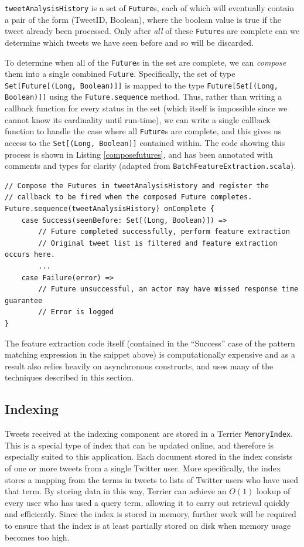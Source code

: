 \documentclass{l4proj}
\newcommand{\code}[1]{\texttt{#1}}
\begin{document}
\code{tweetAnalysisHistory} is a set of \code{Future}s, each of which will eventually contain a pair of the form (TweetID, Boolean), where the boolean value is true if the tweet already been processed. Only after \textit{all} of these \code{Future}s are complete can we determine which tweets we have seen before and so will be discarded.

To determine when all of the \code{Future}s in the set are complete, we can \textit{compose} them into a single combined \code{Future}. Specifically, the set of type \code{Set[Future[(Long, Boolean)]]} is mapped to the type \code{Future[Set[(Long, Boolean)]]} using the \code{Future.sequence} method. Thus, rather than writing a callback function for every status in the set (which itself is impossible since we cannot know its cardinality until run-time), we can write a single callback function to handle the case where all \code{Future}s are complete, and this gives us access to the \code{Set[(Long, Boolean)]} contained within. The code showing this process is shown in Listing \ref{composefutures}, and has been annotated with comments and types for clarity (adapted from  \code{BatchFeatureExtraction.scala}).

\begin{lstlisting}[caption=Composing Futures unto a single future and registering the onComplete callback.,label=composefutures]
// Compose the Futures in tweetAnalysisHistory and register the
// callback to be fired when the composed Future completes.
Future.sequence(tweetAnalysisHistory) onComplete {
    case Success(seenBefore: Set[(Long, Boolean)]) =>
        // Future completed successfully, perform feature extraction
        // Original tweet list is filtered and feature extraction occurs here.
        ...
    case Failure(error) =>
        // Future unsuccessful, an actor may have missed response time guarantee
        // Error is logged
}
\end{lstlisting}

The feature extraction code itself (contained in the ``Success'' case of the pattern matching expression in the snippet above) is computationally expensive and as a result also relies heavily on asynchronous constructs, and uses many of the techniques described in this section.

        \subsection{Indexing}
        Tweets received at the indexing component are stored in a Terrier \code{MemoryIndex}. This is a special type of index that can be updated  online, and therefore is especially suited to this application. Each document stored in the index consists of one or more tweets from a single Twitter user. More specifically, the index stores a mapping from the terms in tweets to lists of Twitter users who have used that term. By storing data in this way, Terrier can achieve an $O(1)$ lookup of every user who has used a query term, allowing it to carry out retrieval quickly and efficiently. Since the index is stored in memory, further work will be required to ensure that the index is at least partially stored on disk when memory usage becomes too high.
        
\end{document}
